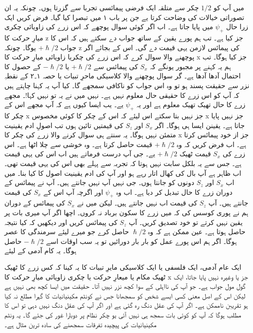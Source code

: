 میں آپ کو 
$1/2$
چکر سے متلقہ ایک فرضی پیمائسی تجربا سے گزرتا ہوں۔ چونکہ یہ ان تصوراتی خیالات کی وضاحت کرتا یے جن پر باب ۱ میں تبصرا کیا گیا۔ فرض کریں ایک زرا حال
$\psi_+$
 میں پایا جاتا ہے۔ اب اگر کوئی سوال پوچھے کہ اس زرے کی زاویائی چکری میارِ حرکت کا 
 z
 جز کیا ہے۔ تب ہم پورے یقین کے ساتھ جواب دے سکتے ہیں کہ اس کا جواب   
 $+\hslash/2$
 یوگا۔ چونکہ 
 z
 کی پیمائس لازمن یہی قیمت دے گی۔ اس کے بجائے اگر پوچھنے والا سوال کرے کہ اس زرے کی چکریا زاویائی میارِ حرکت کا
 x
 جز کیا ہوگا۔ تب ہم یہ کہنے پر مجبور یونگے کہ 
 $S_x$
 کی پیمائس سے 
 $+\hslash/2$
  یا
  $-\hslash/2$
کے حصول کا احتمال آدھا آدھا ہے۔ گر  سوال پوچھنے والا کلاسیکی ماحرِ تبیات یا حصہ ۱۔۲ کے نقطہِ نزر سے حقیقت پسند ہو تو وہ اس جواب کو ناکافی سمجھے گا۔ کیا آپ یہ کہنا چاہتے ہیں کہ آپ کو اس زرے کا حقیقی حال معلوم نہیں ہے۔ نہیں میں نے یہ تو نہیں کہا!۔ مجھے زرے کا حال تھیک تھیک معلوم ہے اور یہ 
$\psi_+$
یے۔ یب ایسا کیوں ہے کہ آپ مجھے اس کے چکر کا 
x
جز نہیں بتا سکتے اس لیئے کہ اس کے چکر کا کوئی مخصوس 
x
جز نہیں پایا جاتا ہے۔ یقینن ایسا ہی ہوگا۔ اگر 
$S_x$
اور
$S_z$
کی قیمتیں تائین ہوں تب اصولِ ادم یقینیت متمئن نہیں ہوگا۔ یہ سنتے ہی سوال کرنے والا زرے کی چکر کا 
x
 جز از خود پیمائس کرتا ہے۔ اب فرض کریں کہ وہ
 $+\hslash/2$
 قیمت حاصل کرتا ہے۔ وہ خوشی سے چلا اٹھا ہے۔ اس زرے کی 
 $S_x$
 قیمت ٹھیک
 $+\hslash/2$
 یے۔ جی آپ درست فرماتے ہیں اب اس کی یہی قیمت ہے۔ جس سے یہ بلکل سابت نہیں ہوتا کہ تجربہ سے پہلے بھی اس کی یہی قیمت تھی۔ اب ظاہر ہے آپ بال کی کھال اتار رہے ہو اور آپ کی ادم یقینیت اصول کا کیا بنا۔ میں اب 
 $S_x$
 اور 
  $S_z$
  دونوں کو جانتا ہوں۔ جی نہیں آپ نہیں جانتے  
ہیں۔ آپ نے پیمائس کے دوران زرے کا حال تبدیل کر دیا ہے۔ اب وہ  
$\psi_+$
اور اگرچہ آپ اس کے 
$S_x$
کی قیمت جانتے ہیں۔ آپ
$S_z$
کی قیمت اب نہیں جانتے ہیں۔ لیکن میں نے 
 $S_x$
 کی پیمائس کے دوران ہم نے پوری کوسس کی کہ میں زرے کا سکون برباد نہ کروں۔ اچھا اگر آپ میری بات پر یقین نہیں کرتے تو خود تصدیق کریں۔ آپ
$S_z$
کی پیمائس کریں اور دیکھیں کہ کیا نتیجہ حاصل ہوتا ہے۔ عین ممکن ہے کہ وہ 
 $\hslash/2$
حاصل کرے جو میرے لیئے سرمندگی کا عصر ہوگا۔ اگر ہم اس پورے عمل کو بار بار دورائیں تو یہ سب اوقات اسے   
$-\hslash/2$
حاصل ہوگا۔ یہ کام آدمی کے لیئے

ایک عام آدمی، ایک فلسفی یا ایک کلاسیکی مایرِ تبیات کا یہ کینا کہ کس زرے  کا ٹھیک ٹھیک مکام یا میعارِ حرکت یا چکری زاویائی میارِ حرکت کا
x
جز یا وغیرہ نہیں پایا جاتا،  ایک گول مول جواب ہے۔ جو آپ کی نااہلی کے سوا کچھ نزر نہیں آتا۔ حقیقت میں ایسا کچھ بھی نہیں ہے لیکن اس کے اصل معنی کسی ایسے شخص کو سمجھانا جس نے کونٹم مکینیانیات کا گہرا مطلع نہ کیا ہو تقریبن ناممکن ہے۔ اگر آپ کی عقل دنگ رہ گئی ہے اور اگر آپ کی عقل دنگ نہیں دہی تو اس کا مطلب ہوگا کہ آپ کو کوئی بات سمجھ ہی نہیں آئی یو  
چکر نظام پر دوبارا غور کی جئے گا۔ یہ  ونٹم مکینیانیات کی پیچیدہ تفرقات سمجھنے کی سادہ ترین مثال ہے۔


